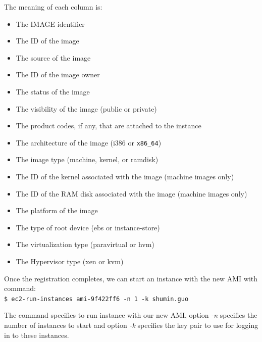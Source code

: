 The meaning of each column is:
\begin{itemize}
  \item The IMAGE identifier
  \item The ID of the image
  \item The source of the image
  \item The ID of the image owner
  \item The status of the image
  \item The visibility of the image (public or private)
  \item The product codes, if any, that are attached to the instance
  \item The architecture of the image (i386 or \verb|x86_64|)
  \item The image type (machine, kernel, or ramdisk)
  \item The ID of the kernel associated with the image (machine images only)
  \item The ID of the RAM disk associated with the image (machine images only)
  \item The platform of the image
  \item The type of root device (ebs or instance-store)
  \item The virtualization type (paravirtual or hvm)
  \item The Hypervisor type (xen or kvm)
\end{itemize}

Once the registration completes, we can start an instance with the new AMI with command: \\
\verb|$ ec2-run-instances ami-9f422ff6 -n 1 -k shumin.guo|

The command specifies to run instance with our new AMI, option \emph{-n} specifies the number of instances to start and option \emph{-k} specifies the key pair to use for logging in to these instances.

